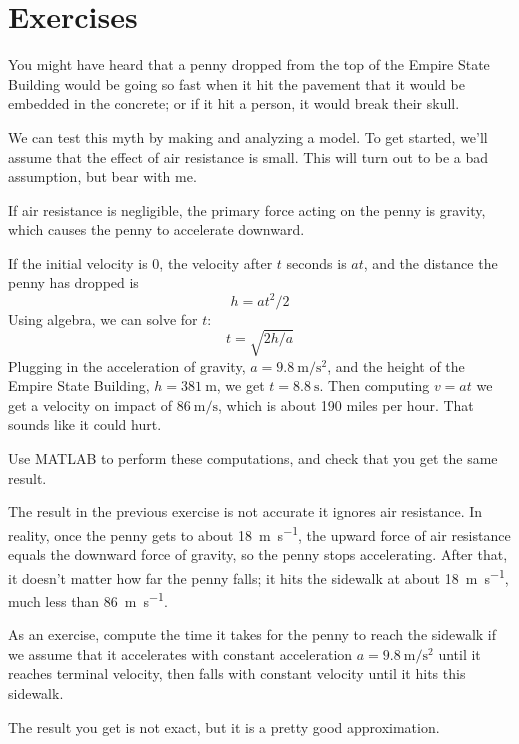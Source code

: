 \documentclass[
]{book}
\numberwithin{Answer}{chapter}
\numberwithin{Exercise}{chapter}
\begin{document}
\section{Exercises}

\newenvironment{ex}{\begin{Exercise}}{\end{Exercise}}

\begin{ex}
\label{penny}
You might have heard that a penny dropped from the top of the Empire State Building would be going so fast when it hit the pavement that it would be embedded in the concrete; or if it hit a person, it would break their skull.


We can test this myth by making and analyzing a model.  To get started, we'll assume that the effect of air resistance is small.  This will turn out to be a bad assumption, but bear with me.

If air resistance is negligible, the primary force acting on the penny is gravity, which causes the penny to accelerate downward.

If the initial velocity is 0, the velocity after $t$ seconds is $a t$, and the distance the penny has dropped is
%
\[ h = a t^2 / 2 \]
%
Using algebra, we can solve for $t$:
%
\[ t = \sqrt{ 2 h / a} \]
%
Plugging in the acceleration of gravity, 
$a = \SI{9.8}{\meter\per\second\squared}$, and the height of the Empire State Building, 
$h = \SI{381}{\meter}$, we get 
$t = \SI{8.8}{\second}$.  
Then computing $v = a t$ we get a velocity on impact of $\SI{86}{\meter\per\second}$, which is about 190 miles per hour.  That sounds like it could hurt.

Use MATLAB to perform these computations, and check that you get the same result.
\end{ex}

\begin{ex}
The result in the previous exercise is not accurate it ignores air resistance.  In reality, once the penny gets to about \SI{18}{\meter\per\second}, the upward force of air resistance equals the downward force of gravity, so the penny stops accelerating.  After that, it doesn't matter how far the penny falls; it hits the sidewalk at about \SI{18}{\meter\per\second}, much less than \SI{86}{\meter\per\second}.

As an exercise, compute the time it takes for the penny to reach the sidewalk if we assume that it accelerates with constant acceleration
$a = \SI{9.8}{\meter\per\second\squared}$ until it reaches terminal velocity, then falls with constant velocity until it hits this sidewalk.

The result you get is not exact, but it is a pretty good approximation.

\end{ex}
\end{document}
